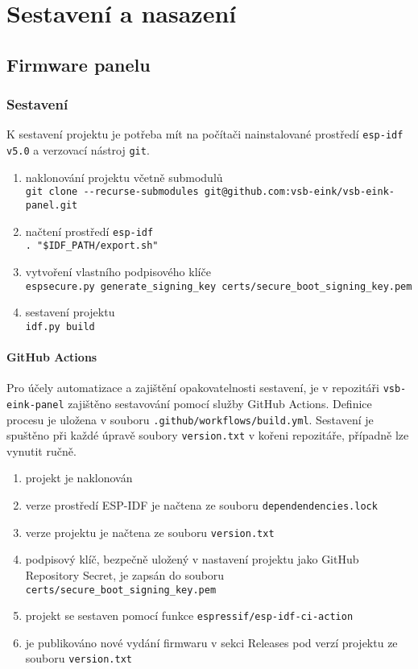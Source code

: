 \chapter{Sestavení a nasazení}

\section{Firmware panelu}
\subsection{Sestavení}
K sestavení projektu je potřeba mít na počítači nainstalované prostředí \lstinline|esp-idf v5.0| a verzovací nástroj \lstinline|git|.

\begin{enumerate}
    \item naklonování projektu včetně submodulů \\ \lstinline{git clone --recurse-submodules git@github.com:vsb-eink/vsb-eink-panel.git}
    \item načtení prostředí \lstinline|esp-idf| \\ \lstinline{. "$IDF_PATH/export.sh"}
    \item vytvoření vlastního podpisového klíče \\ \lstinline|espsecure.py generate_signing_key certs/secure_boot_signing_key.pem|
    \item sestavení projektu \\ \lstinline|idf.py build|
\end{enumerate}

\subsubsection{GitHub Actions}
Pro účely automatizace a zajištění opakovatelnosti sestavení, je v repozitáři \lstinline|vsb-eink-panel| zajištěno sestavování pomocí služby GitHub Actions. Definice procesu je uložena v souboru \lstinline|.github/workflows/build.yml|. Sestavení je spuštěno při každé úpravě soubory \lstinline|version.txt| v kořeni repozitáře, případně lze vynutit ručně.

\begin{enumerate}
    \item projekt je naklonován
    \item verze prostředí ESP-IDF je načtena ze souboru \lstinline|dependendencies.lock|
    \item verze projektu je načtena ze souboru \lstinline|version.txt|
    \item podpisový klíč, bezpečně uložený v nastavení projektu jako GitHub Repository Secret\cite{UsingSecretsGitHub}, je zapsán do souboru \lstinline|certs/secure_boot_signing_key.pem|
    \item projekt se sestaven pomocí funkce \lstinline|espressif/esp-idf-ci-action|
    \item je publikováno nové vydání firmwaru v sekci Releases pod verzí projektu ze souboru \lstinline|version.txt|
\end{enumerate}

